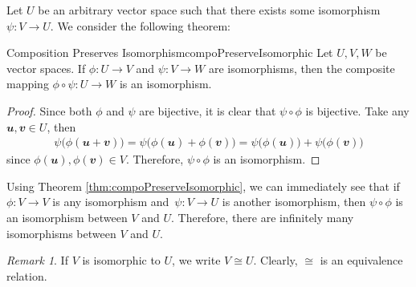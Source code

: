 \documentclass[math]{amznotes}
\theoremstyle{remark}
\newtheorem*{remark}{Remark}
\begin{document}
Let $U$ be an arbitrary vector space such that there exists some isomorphism $\psi \colon V \to U$. We consider the following theorem:
\begin{thmbox}{Composition Preserves Isomorphism}{compoPreserveIsomorphic}
    Let $U, V, W$ be vector spaces. If $\phi \colon U \to V$ and $\psi \colon V \to W$ are isomorphisms, then the composite mapping $\phi \circ \psi \colon U \to W$ is an isomorphism.
    \tcblower
    \begin{proof}
        Since both $\phi$ and $\psi$ are bijective, it is clear that $\psi \circ \phi$ is bijective. Take any $\mathbfit{u}, \mathbfit{v} \in U$, then
        \begin{align*}
            \psi\bigl(\phi(\mathbfit{u + v})\bigr) = \psi\bigl(\phi(\mathbfit{u}) + \phi(\mathbfit{v})\bigr) = \psi\bigl(\phi(\mathbfit{u})\bigr) + \psi\bigl(\phi(\mathbfit{v})\bigr)
        \end{align*}
        since $\phi(\mathbfit{u}), \phi(\mathbfit{v}) \in V$. Therefore, $\psi \circ \phi$ is an isomorphism.
    \end{proof}
\end{thmbox}
Using Theorem \ref{thm:compoPreserveIsomorphic}, we can immediately see that if $\phi \colon V \to V$ is any isomorphism and~$\psi \colon V \to U$ is another isomorphism, then $\psi \circ \phi$ is an isomorphism between $V$ and $U$. Therefore, there are infinitely many isomorphisms between $V$ and $U$.
\begin{notebox}
    \begin{remark}
        If $V$ is isomorphic to $U$, we write $V \cong U$. Clearly, $\cong$ is an equivalence relation.
    \end{remark}
\end{notebox}
\end{document}
